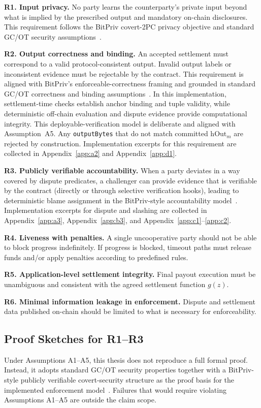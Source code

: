 \documentclass[final,twoside]{vutinfth}
\begin{document}
\textbf{R1. Input privacy.}
No party learns the counterparty's private input beyond what is implied by the
prescribed output and mandatory on-chain disclosures. This requirement follows
the BitPriv covert-2PC privacy objective and standard GC/OT security
assumptions~\cite{BitPriv2025,Bellare2012FoundationsGC,LindellPinkas2008}.

\textbf{R2. Output correctness and binding.}
An accepted settlement must correspond to a valid protocol-consistent output.
Invalid output labels or inconsistent evidence must be rejectable by the
contract. This requirement is aligned with BitPriv's enforceable-correctness
framing and grounded in standard GC/OT correctness and binding
assumptions~\cite{BitPriv2025,Bellare2012FoundationsGC,LindellPinkas2008}.
In this implementation, settlement-time checks establish anchor binding and
tuple validity, while deterministic off-chain evaluation and dispute evidence
provide computational integrity. This deployable-verification model is
deliberate and aligned with Assumption~A5. Any \texttt{outputBytes} that do not
match committed $\mathrm{hOut}_m$ are rejected by construction.
Implementation excerpts for this requirement are collected in
Appendix~\ref{app:a2} and Appendix~\ref{app:d1}.

\textbf{R3. Publicly verifiable accountability.}
When a party deviates in a way covered by dispute predicates, a challenger can
provide evidence that is verifiable by the contract (directly or through
selective verification hooks), leading to deterministic blame assignment in the
BitPriv-style accountability model~\cite{BitPriv2025,Zhu2019PV2PC}.
Implementation excerpts for dispute and slashing are collected in
Appendix~\ref{app:a3}, Appendix~\ref{app:b3}, and
Appendix~\ref{app:c1}--\ref{app:c2}.

\textbf{R4. Liveness with penalties.}
A single uncooperative party should not be able to block progress indefinitely.
If progress is blocked, timeout paths must release funds and/or apply penalties
according to predefined rules.

\textbf{R5. Application-level settlement integrity.}
Final payout execution must be unambiguous and consistent with the agreed settlement function $g(z)$.

\textbf{R6. Minimal information leakage in enforcement.}
Dispute and settlement data published on-chain should be limited to what is
necessary for enforceability.

\subsection{Proof Sketches for R1--R3}
Under Assumptions A1--A5, this thesis does not reproduce a full formal proof.
Instead, it adopts standard GC/OT security properties together with a
BitPriv-style publicly verifiable covert-security structure as the proof basis
for the implemented enforcement
model~\cite{BitPriv2025,Bellare2012FoundationsGC,LindellPinkas2008,Zhu2019PV2PC}.
Failures that would require violating Assumptions A1--A5 are outside the claim
scope.
\end{document}

